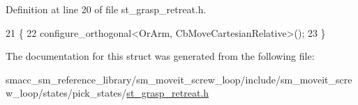Definition at line 20 of file st\+\_\+grasp\+\_\+retreat.\+h.


\begin{DoxyCode}
21     \{
22         configure\_orthogonal<OrArm, CbMoveCartesianRelative>();
23     \}
\end{DoxyCode}


The documentation for this struct was generated from the following file\+:\begin{DoxyCompactItemize}
\item 
smacc\+\_\+sm\+\_\+reference\+\_\+library/sm\+\_\+moveit\+\_\+screw\+\_\+loop/include/sm\+\_\+moveit\+\_\+screw\+\_\+loop/states/pick\+\_\+states/\hyperlink{sm__moveit__screw__loop_2include_2sm__moveit__screw__loop_2states_2pick__states_2st__grasp__retreat_8h}{st\+\_\+grasp\+\_\+retreat.\+h}\end{DoxyCompactItemize}
